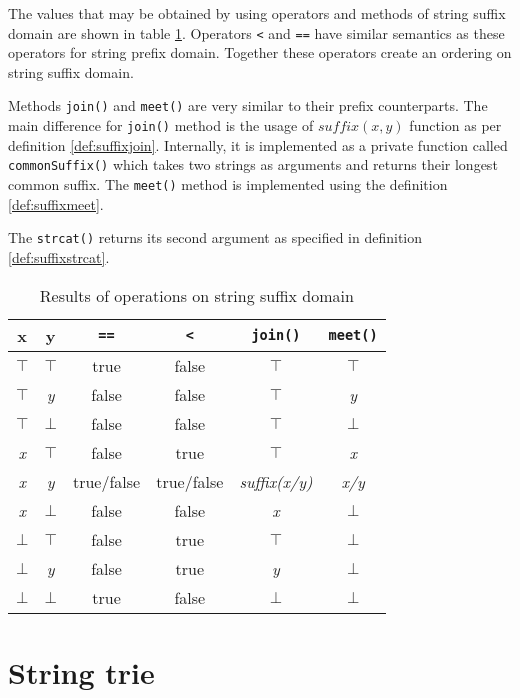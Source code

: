 \documentclass[12pt,final,oneside]{fithesis2}
\theoremstyle{definition}
\begin{document}
The values that may be obtained by using operators and methods of string suffix
domain are shown in table \ref{tab:suffixops}. Operators \texttt{<} and
\texttt{==} have similar semantics as these operators for string prefix domain.
Together these operators create an ordering on string suffix domain.

Methods \texttt{join()} and \texttt{meet()} are very similar to their prefix
counterparts. The main difference for \texttt{join()} method is the usage of
$\textit{suffix}(x, y)$ function as per definition \ref{def:suffixjoin}.
Internally, it is implemented as a private function called
\texttt{commonSuffix()} which takes two strings as arguments and returns their
longest common suffix. The \texttt{meet()} method is implemented using the
definition \ref{def:suffixmeet}.

The \texttt{strcat()} returns its second argument as specified in definition
\ref{def:suffixstrcat}.

\begin{table}[ht]
\centering
\begin{tabular}{c|c|c|c|c|c}
 x & y & \texttt{==} & \texttt{<} & \texttt{join()} & \texttt{meet()} \\
\hline
$\top$     & $\top$     & true       & false      & $\top$       & $\top$ \\
$\top$     & \textit{y} & false      & false      & $\top$       & \textit{y} \\
$\top$     & $\bot$     & false      & false      & $\top$       & $\bot$ \\
\textit{x} & $\top$     & false      & true       & $\top$       & \textit{x} \\
\textit{x} & \textit{y} & true/false & true/false & \textit{suffix(x/y)} & \textit{x/y} \\
\textit{x} & $\bot$     & false      & false      & \textit{x}   & $\bot$ \\
$\bot$     & $\top$     & false      & true       & $\top$       & $\bot$ \\
$\bot$     & \textit{y} & false      & true       & \textit{y}   & $\bot$ \\
$\bot$     & $\bot$     & true       & false      & $\bot$       & $\bot$
\end{tabular}
\caption{Results of operations on string suffix domain}
\label{tab:suffixops}
\end{table}

\section{String trie}
\end{document}
